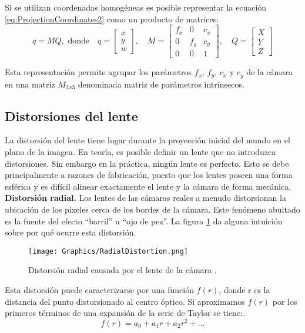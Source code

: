 Si se utilizan coordenadas homogéneas \cite{JamesAndriesStevenJohnRichard} es posible representar la ecuación \ref{eq:ProjectionCoordinates2} como un producto de matrices:
$$
    q=MQ, \text{ donde} \quad
    q = \begin{bmatrix}x\\y\\w\end{bmatrix},\quad
    M = \begin{bmatrix}
	    f_x & 0 & c_x \\
	    0 & f_y & c_y \\
	    0 & 0 & 1
        \end{bmatrix},\quad
    Q = \begin{bmatrix}X\\Y\\Z\end{bmatrix}
$$

Esta representación permite agrupar los parámetros $f_x$, $f_y$, $c_x$ y $c_y$ de la cámara en una matriz $M_{3x3}$ denominada matriz de parámetros intrínsecos.

\subsection{Distorsiones del lente}

La distorsión del lente tiene lugar durante la proyección inicial del mundo en el plano de la imagen. En teoría, es posible definir un lente que no introduzca distorsiones. Sin embargo en la práctica, ningún lente es perfecto. Esto se debe principalmente a razones de fabricación, puesto que los lentes poseen una forma esférica y es difícil alinear exactamente el lente y la cámara de forma mecánica.\\

\textbf{Distorsión radial.}
Los lentes de las cámaras reales a menudo distorsionan la ubicación de los píxeles cerca de los bordes de la cámara. Este fenómeno abultado es la fuente del efecto ``barril'' u ``ojo de pez''. La figura \ref{fig:RadialDistortion} da alguna intuición sobre por qué ocurre esta distorsión.

\begin{figure}[h!]
    \centering
    \texttt{[image: Graphics/RadialDistortion.png]}
    \caption{Distorsión radial causada por el lente de la cámara \cite{DVD}.}
    \label{fig:RadialDistortion}
\end{figure}

Esta distorsión puede caracterizarse por una función $f(r)$, donde r es la distancia del punto distorsionado al centro óptico. Si aproximamos $f(r)$ por los primeros términos de una expansión de la serie de Taylor \cite{Nicolas} se tiene:.
$$f(r)=a_0+a_1r+a_2r^2+\dots$$

